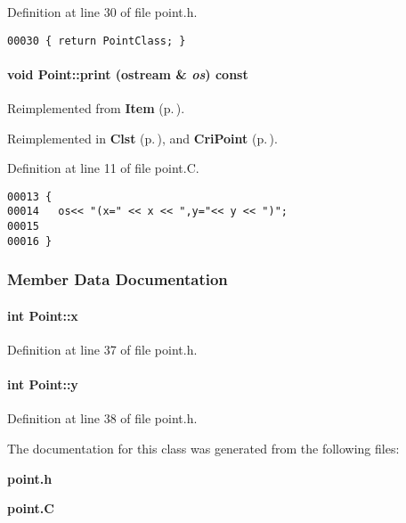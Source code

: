 Definition at line 30 of file point.h.\small\begin{verbatim}00030 { return PointClass; }
\end{verbatim}\normalsize 
\label{Point_a6}
\paragraph{\setlength{\rightskip}{0pt plus 5cm}void Point::print (ostream \& {\em os}) const\hspace{0.3cm}{\tt  [virtual]}}\hfill



Reimplemented from {\bf Item} {\rm (p.\,\pageref{Item_a8})}.

Reimplemented in {\bf Clst} {\rm (p.\,\pageref{Clst_a5})}, and {\bf Cri\-Point} {\rm (p.\,\pageref{CriPoint_a5})}.

Definition at line 11 of file point.C.\small\begin{verbatim}00013 {
00014   os<< "(x=" << x << ",y="<< y << ")";
00015 
00016 }
\end{verbatim}\normalsize 


\subsubsection{Member Data Documentation}
\label{Point_m0}
\paragraph{\setlength{\rightskip}{0pt plus 5cm}int Point::x}\hfill



Definition at line 37 of file point.h.\label{Point_m1}
\paragraph{\setlength{\rightskip}{0pt plus 5cm}int Point::y}\hfill



Definition at line 38 of file point.h.

The documentation for this class was generated from the following files:\begin{CompactItemize}
\item 
{\bf point.h}\item 
{\bf point.C}\end{CompactItemize}
